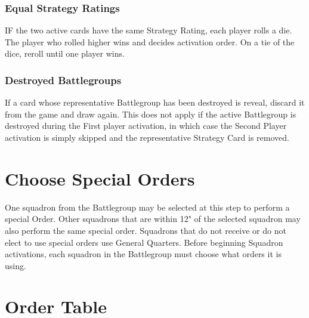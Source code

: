 \subsubsection{Equal Strategy Ratings}
IF the two active cards have the same Strategy Rating, each player rolls a die. The player who rolled higher wins and decides activation order. On a tie of the dice, reroll until one player wins.

\subsubsection{Destroyed Battlegroups}
If a card whose representative Battlegroup has been destroyed is reveal, discard it from the game and draw again. This does not apply if the active Battlegroup is destroyed during the First player activation, in which case the Second Player activation is simply skipped and the representative Strategy Card is removed.

\section{Choose Special Orders}
One squadron from the Battlegroup may be selected at this step to perform a special Order. Other squadrons that are within 12" of the selected squadron may also perform the same special order. Squadrons that do not receive or do not elect to use special orders use General Quarters. Before beginning Squadron activations, each squadron in the Battlegroup must choose what orders it is using.

\section{Order Table}

